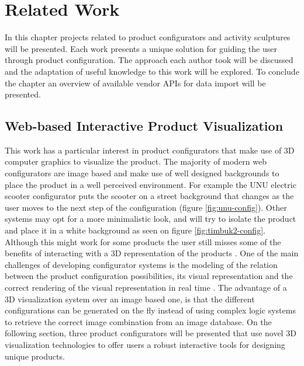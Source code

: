 \documentclass[../medieninformatik-arbeit.tex]{subfiles}
\begin{document}
\section{Related Work}
\label{ch:related}
In this chapter projects related to product configurators and activity
sculptures will be presented. Each work presents a unique solution for guiding the user through product configuration. The approach each author took will be discussed and the adaptation of useful knowledge to this work will be explored. To conclude the chapter an overview of available vendor APIs for data import will be presented. 

\subsection{Web-based Interactive Product Visualization}
This work has a particular interest in product configurators that make use of 3D
computer graphics to visualize the product. The majority of modern web
configurators are image based and make use of well designed backgrounds to place the
product in a well perceived environment. For example the UNU electric scooter
configurator puts the scooter on a street background that
changes as the user moves to the next step of the configuration (figure \ref{fig:unu-config}). 
Other systems may opt for a more minimalistic look, and will try to isolate the
product and place it in a white background as seen on
figure \ref{fig:timbuk2-config}. 
Although this might work for some products the user still misses some of the benefits of
interacting with a 3D representation of the products \cite{vande2009analyzing}.
One of the main challenges of developing  configurator systems is the modeling
of the relation between the product configuration possibilities, its visual representation
and the correct rendering of the visual representation in real
time \cite{feliceinteractive}. The advantage of a 3D visualization system
over an image based one, is that the different configurations can be generated on
the fly instead of using complex logic systems to retrieve the correct image
combination from an image database. On the following section, three product
configurators will be presented that use novel 3D visualization technologies to
offer users a robust interactive tools for designing unique products.
\end{document}
